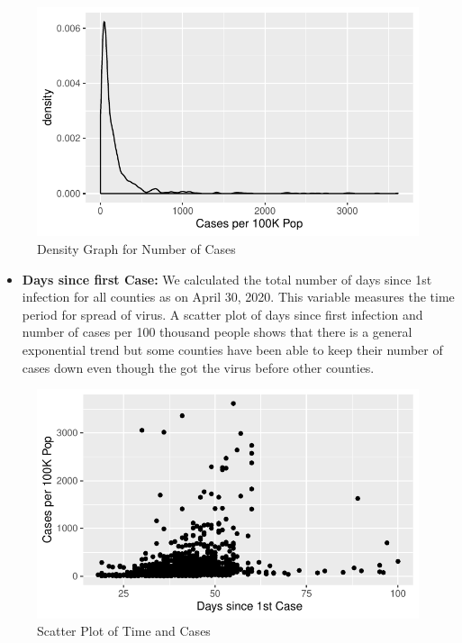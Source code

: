 \documentclass[
]{article}
\providecommand{\tightlist}{%
  \setlength{\itemsep}{0pt}\setlength{\parskip}{0pt}}
\begin{document}
\begin{figure}
\centering
\includegraphics{Final-Project-Covid-19_files/figure-latex/unnamed-chunk-3-1.pdf}
\caption{Density Graph for Number of Cases}
\end{figure}

\begin{itemize}
\tightlist
\item
  \textbf{Days since first Case:} We calculated the total number of days
  since 1st infection for all counties as on April 30, 2020. This
  variable measures the time period for spread of virus. A scatter plot
  of days since first infection and number of cases per 100 thousand
  people shows that there is a general exponential trend but some
  counties have been able to keep their number of cases down even though
  the got the virus before other counties.
\end{itemize}

\begin{figure}
\centering
\includegraphics{Final-Project-Covid-19_files/figure-latex/unnamed-chunk-4-1.pdf}
\caption{Scatter Plot of Time and Cases}
\end{figure}
\end{document}
